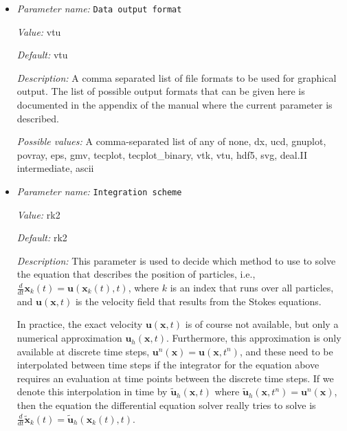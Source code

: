 \begin{itemize}
\item {\it Parameter name:} {\tt Data output format}
\label{parameters:Postprocess/Particles/Data output format}
\label{parameters:Postprocess/Particles/Data_20output_20format}


{\it Value:} vtu


{\it Default:} vtu


{\it Description:} A comma separated list of file formats to be used for graphical output. The list of possible output formats that can be given here is documented in the appendix of the manual where the current parameter is described.


{\it Possible values:} A comma-separated list of any of none, dx, ucd, gnuplot, povray, eps, gmv, tecplot, tecplot\_binary, vtk, vtu, hdf5, svg, deal.II intermediate, ascii
\item {\it Parameter name:} {\tt Integration scheme}
\label{parameters:Postprocess/Particles/Integration scheme}
\label{parameters:Postprocess/Particles/Integration_20scheme}


{\it Value:} rk2


{\it Default:} rk2


{\it Description:} This parameter is used to decide which method to use to solve the equation that describes the position of particles, i.e., $\frac{d}{dt}\mathbf x_k(t) = \mathbf u(\mathbf x_k(t),t)$, where $k$ is an index that runs over all particles, and $\mathbf u(\mathbf x,t)$ is the velocity field that results from the Stokes equations.

In practice, the exact velocity $\mathbf u(\mathbf x,t)$ is of course not available, but only a numerical approximation $\mathbf u_h(\mathbf x,t)$. Furthermore, this approximation is only available at discrete time steps, $\mathbf u^n(\mathbf x)=\mathbf u(\mathbf x,t^n)$, and these need to be interpolated between time steps if the integrator for the equation above requires an evaluation at time points between the discrete time steps. If we denote this interpolation in time by $\tilde{\mathbf u}_h(\mathbf x,t)$ where $\tilde{\mathbf u}_h(\mathbf x,t^n)=\mathbf u^n(\mathbf x)$, then the equation the differential equation solver really tries to solve is $\frac{d}{dt}\tilde{\mathbf x}_k(t) =  \tilde{\mathbf u}_h(\mathbf x_k(t),t)$.


\end{itemize}
